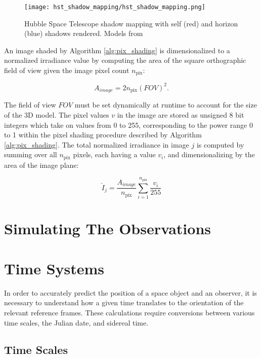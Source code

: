 \begin{figure}[!htb]
  \centering
  \texttt{[image: hst\_shadow\_mapping/hst\_shadow\_mapping.png]}
  \caption{Hubble Space Telescope shadow mapping with self (red) and horizon (blue) shadows rendered. Models from \cite{nasa_models}}
  \label{fig:hst_shadows_map}
\end{figure}
\graphicspath{{/Users/liamrobinson/Documents/PyLightCurves/docs/build/html/_images}}

An image shaded by Algorithm \ref{alg:pix_shading} is dimensionalized to a normalized irradiance value by computing the area of the square orthographic field of view given the image pixel count $n_\mathrm{pix}$:

\begin{equation} \label{eq:ortho_area}
  A_{image} = 2 n_\mathrm{pix} \left(FOV \right)^2.
\end{equation}

The field of view $FOV$ must be set dynamically at runtime to account for the size of the 3D model. The pixel values $v$ in the image are stored as unsigned 8 bit integers which take on values from 0 to 255, corresponding to the power range 0 to 1 within the pixel shading procedure described by Algorithm \ref{alg:pix_shading}. The total normalized irradiance in image $j$ is computed by summing over all $n_\mathrm{pix}$ pixels, each having a value $v_i$, and dimensionalizing by the area of the image plane:

\begin{equation} \label{eq:lc_normalized_engine}
  \check{I}_j = \frac{A_{image}}{n_\mathrm{pix}} \sum_{i=1}^{n_\mathrm{pix}}{\frac{v_{i}}{255}}
\end{equation}

\section{Simulating The Observations}

\section{Time Systems}

In order to accurately predict the position of a space object and an observer, it is necessary to understand how a given time translates to the orientation of the relevant reference frames. These calculations require conversions between various time scales, the Julian date, and sidereal time.

\subsection{Time Scales}

